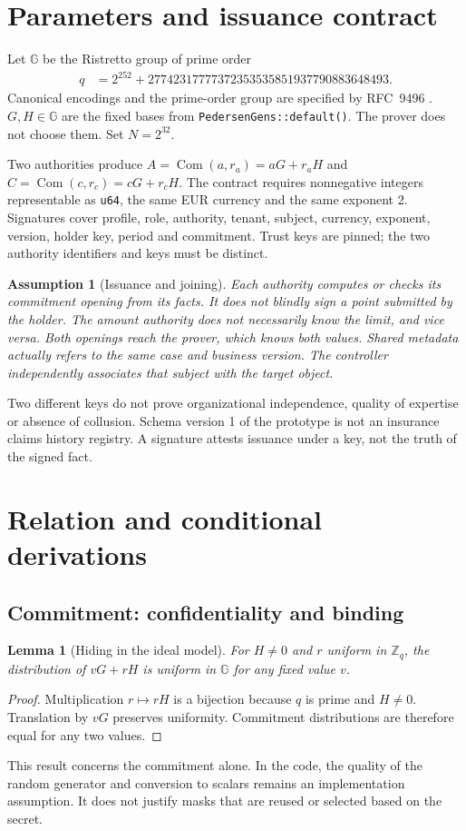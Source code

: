 \documentclass[11pt,a4paper]{article}
\newtheorem{lemma}[theorem]{Lemma}
\newtheorem{assumption}[theorem]{Assumption}
\newcommand{\Com}{\operatorname{Com}}
\newcommand{\Zq}{\mathbb Z_q}
\newcommand{\code}[1]{\nolinkurl{#1}}
\begin{document}
\section{Parameters and issuance contract}
Let $\mathbb G$ be the Ristretto group of prime order
\begin{align*}
q&=2^{252}+27742317777372353535851937790883648493.
\end{align*}
Canonical encodings and the prime-order group are specified by RFC~9496
\cite{rfc9496}. $G,H\in\mathbb G$ are the fixed bases from
\code{PedersenGens::default()}. The prover does not choose them. Set $N=2^{32}$.

Two authorities produce $A=\Com(a,r_a)=aG+r_aH$ and
$C=\Com(c,r_c)=cG+r_cH$. The contract requires nonnegative integers
representable as \code{u64}, the same EUR currency and the same exponent 2.
Signatures cover profile, role, authority, tenant, subject, currency, exponent,
version, holder key, period and commitment. Trust keys are pinned;
the two authority identifiers and keys must be distinct.

\begin{assumption}[Issuance and joining]
Each authority computes or checks its commitment opening from its facts.
It does not blindly sign a point submitted by the holder.
The amount authority does not necessarily know the limit, and vice versa.
Both openings reach the prover, which knows both values.
Shared metadata actually refers to the same case and business version.
The controller independently associates that subject with the target object.
\end{assumption}
Two different keys do not prove organizational independence, quality of
expertise or absence of collusion. Schema version 1 of the prototype is not
an insurance claims history registry. A signature attests issuance under a key,
not the truth of the signed fact.

\section{Relation and conditional derivations}
\subsection{Commitment: confidentiality and binding}
\begin{lemma}[Hiding in the ideal model]
For $H\ne0$ and $r$ uniform in $\Zq$, the distribution of $vG+rH$ is uniform
in $\mathbb G$ for any fixed value $v$.
\end{lemma}
\begin{proof}
Multiplication $r\mapsto rH$ is a bijection because $q$ is prime
and $H\ne0$. Translation by $vG$ preserves uniformity. Commitment
distributions are therefore equal for any two values.
\end{proof}
This result concerns the commitment alone. In the code, the quality of the
random generator and conversion to scalars remains an implementation assumption.
It does not justify masks that are reused or selected based on the secret.
\end{document}
